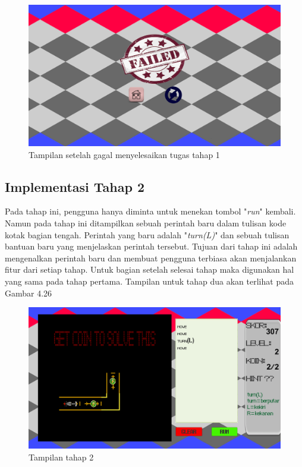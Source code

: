 	\begin{figure}
		\centering
		\includegraphics[width=\linewidth-40pt]{pics/prototipe/ending2}
		\caption{Tampilan setelah gagal menyelesaikan tugas tahap 1}
	\end{figure}
	\subsection{Implementasi Tahap 2}
	Pada tahap ini, pengguna hanya diminta untuk menekan tombol "\textit{run}" kembali. Namun pada tahap ini ditampilkan sebuah perintah baru dalam tulisan kode kotak bagian tengah. Perintah yang baru adalah "\textit{turn(L)}" dan sebuah tulisan bantuan baru yang menjelaskan perintah tersebut. Tujuan dari tahap ini adalah mengenalkan perintah baru dan membuat pengguna terbiasa akan menjalankan fitur dari setiap tahap. Untuk bagian setelah selesai tahap maka digunakan hal yang sama pada tahap pertama. Tampilan untuk tahap dua akan terlihat pada Gambar 4.26
	\begin{figure}
		\centering
		\includegraphics[width=\linewidth-40pt]{pics/prototipe/tahap2}
		\caption{Tampilan tahap 2}
	\end{figure}
